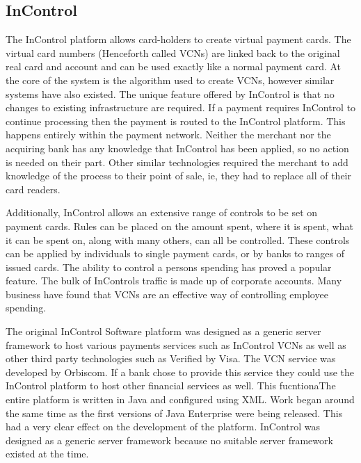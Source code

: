 \documentclass[a4paper,12pt, titlepage]{article}
\begin{document}
\subsection{InControl}
The InControl platform allows card-holders to create virtual payment cards. The virtual card numbers (Henceforth called VCNs) are linked back to the original real card and account and can be used exactly like a normal payment card. At the core of the system is the algorithm used to create VCNs, however similar systems have also existed. The unique feature offered by InControl is that no changes to existing infrastructure are required. If a payment requires InControl to continue processing then the payment is routed to the InControl platform. This happens entirely within the payment network. Neither the merchant nor the acquiring bank has any knowledge that InControl has been applied, so no action is needed on their part. Other similar technologies required the merchant to add knowledge of the process to their point of sale, ie, they had to replace all of their card readers.

Additionally, InControl allows an extensive range of controls to be set on payment cards. Rules can be placed on the amount spent, where it is spent, what it can be spent on, along with many others, can all be controlled. These controls can be applied by individuals to single payment cards, or by banks to ranges of issued cards. The ability to control a persons spending has proved a popular feature. The bulk of InControls traffic is made up of corporate accounts. Many business have found that VCNs are an effective way of controlling employee spending. 

The original InControl Software platform was designed as a generic server framework to host various payments services such as InControl VCNs as well as other third party technologies such as Verified by Visa. The VCN service was developed by Orbiscom. If a bank chose to provide this service they could use the InControl platform to host other financial services as well. This fucntionaThe entire platform is written in Java and configured using XML. Work began around the same time as the first versions of Java Enterprise were being released. This had a very clear effect on the development of the platform. InControl was designed as a generic server framework because no suitable server framework existed at the time.
\end{document}
